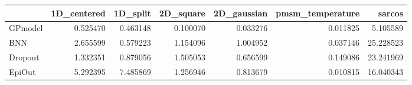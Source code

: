 \begin{tabular}{lrrrrrr}
\toprule
{} &  1D\_centered &  1D\_split &  2D\_square &  2D\_gaussian &  pmsm\_temperature &     sarcos \\
\midrule
GPmodel &     0.525470 &  0.463148 &   0.100070 &     0.033276 &          0.011825 &   5.105589 \\
BNN     &     2.655599 &  0.579223 &   1.154096 &     1.004952 &          0.037146 &  25.228523 \\
Dropout &     1.332351 &  0.879056 &   1.505053 &     0.656599 &          0.149086 &  23.241969 \\
EpiOut  &     5.292395 &  7.485869 &   1.256946 &     0.813679 &          0.010815 &  16.040343 \\
\bottomrule
\end{tabular}
